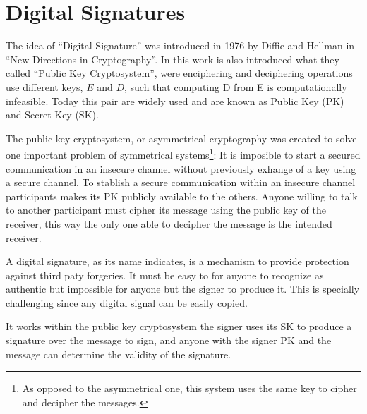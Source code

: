 \section{Digital Signatures}
The idea of ``Digital Signature'' was introduced in 1976 by Diffie and
  Hellman in ``New Directions in Cryptography''\cite{diffie1976new}. In this
  work is also introduced what they called ``Public Key Cryptosystem'', were
  enciphering and deciphering operations use different keys, $E$ and $D$, such
  that computing D from E is computationally infeasible. Today this pair are
  widely used and are known as Public Key (PK) and Secret Key (SK).

The public key cryptosystem, or asymmetrical cryptography was created to solve
  one important problem of symmetrical systems\footnote{As opposed to the
  asymmetrical one, this system uses the same key to cipher and decipher
  the messages.}: It is imposible to start a secured communication in an
  insecure channel without previously exhange of a key using a secure channel.
To stablish a secure communication within an insecure channel participants
  makes its PK publicly available to the others. Anyone willing to talk to
  another participant must cipher its message using the public key of the
  receiver, this way the only one able to decipher the message is the intended
  receiver.

A digital signature, as its name indicates, is a mechanism to provide protection
  against third paty forgeries. It must be easy to for anyone to recognize as
  authentic but impossible for anyone but the signer to produce it. This is
  specially challenging since any digital signal can be easily copied.

It works within the public key cryptosystem the signer uses its SK to produce
  a signature over the message to sign, and anyone with the signer PK and the
  message can determine the validity of the signature.
